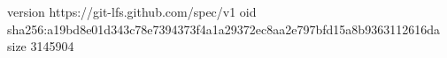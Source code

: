 version https://git-lfs.github.com/spec/v1
oid sha256:a19bd8e01d343c78e7394373f4a1a29372ec8aa2e797bfd15a8b9363112616da
size 3145904
